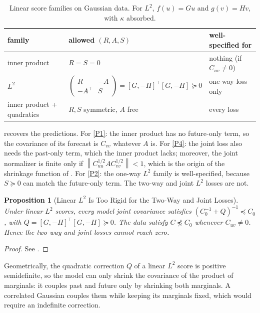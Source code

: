 \documentclass[11pt]{article}
\theoremstyle{plain}
\newtheorem{proposition}[theorem]{Proposition}
\theoremstyle{definition}
\theoremstyle{remark}
\newcommand{\norm}[1]{\left\lVert #1 \right\rVert}
\begin{document}
\begin{table}[ht]
 \centering
 \small
 \begin{tabular}{lll}
  \toprule
  family                      & allowed $(R,A,S)$                                                          & well-specified for          \\
  \midrule
  inner product               & $R=S=0$                                                                    & nothing (if $C_{uv}\ne0$)   \\
  $L^2$                       & $\begin{pmatrix}R&-A\\-A^{\top}&S\end{pmatrix}=[G,-H]^{\top}[G,-H]\succeq0$ & one-way loss only           \\
  inner product + quadratics  & $R,S$ symmetric, $A$ free                                                  & every loss                  \\
  \bottomrule
 \end{tabular}
 \caption{Linear score families on Gaussian data. For $L^2$, $f(u)=Gu$ and
  $g(v)=Hv$, with $\kappa$ absorbed.}
 \label{tab:families}
\end{table}

 recovers the predictions. For \ref{P1}: the inner
product has no future-only term, so the covariance of its forecast is
$C_{vv}$ whatever $A$ is. For \ref{P4}: the joint loss also needs the
past-only term, which the inner product lacks; moreover, the joint normalizer
is finite only if $\norm{C_{uu}^{1/2}AC_{vv}^{1/2}}<1$, which is the origin of
the shrinkage function of \cite{baptista2025mathematical}. For \ref{P2}: the
one-way $L^2$ family is well-specified, because $S\succeq0$ can match the
future-only term. The two-way and joint $L^2$ losses are not.

\begin{proposition}[Linear $L^2$ Is Too Rigid for the Two-Way and Joint Losses]
 \label{prop:l2rigid}
 Under linear $L^2$ scores, every model joint covariance satisfies
 $(C_0^{-1}+Q)^{-1}\preceq C_0$, with $Q=[G,-H]^{\top}[G,-H]\succeq0$. The
 data satisfy $C\not\preceq C_0$ whenever $C_{uv}\neq0$. Hence the two-way
 and joint losses cannot reach zero.
\end{proposition}
\begin{proof}
 See .
\end{proof}

Geometrically, the quadratic correction $Q$ of a linear $L^2$ score is positive
semidefinite, so the model can only shrink the covariance of the product of
marginals: it couples past and future only by shrinking both marginals. A
correlated Gaussian couples them while keeping its marginals fixed, which would
require an indefinite correction.
\end{document}
